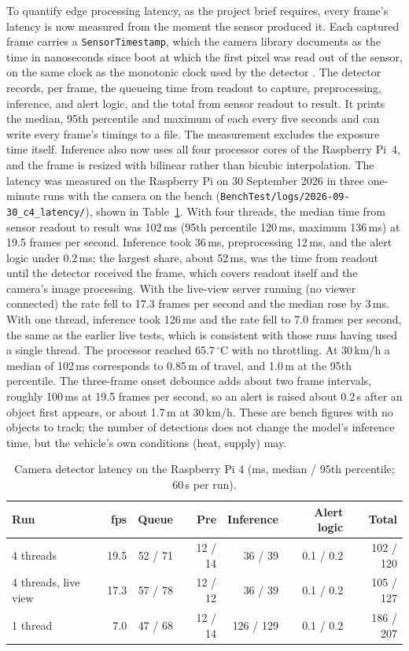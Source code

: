 To quantify edge processing latency, as the project brief requires, every frame's latency is now measured from the moment the sensor produced it. Each captured frame carries a \texttt{SensorTimestamp}, which the camera library documents as the time in nanoseconds since boot at which the first pixel was read out of the sensor, on the same clock as the monotonic clock used by the detector \cite{picamera2manual}. The detector records, per frame, the queueing time from readout to capture, preprocessing, inference, and alert logic, and the total from sensor readout to result. It prints the median, 95th percentile and maximum of each every five seconds and can write every frame's timings to a file. The measurement excludes the exposure time itself. Inference also now uses all four processor cores of the Raspberry Pi~4, and the frame is resized with bilinear rather than bicubic interpolation. The latency was measured on the Raspberry Pi on 30 September 2026 in three one-minute runs with the camera on the bench (\texttt{BenchTest/logs/2026-09-30\_c4\_latency/}), shown in Table~\ref{tab:camera-latency}. With four threads, the median time from sensor readout to result was 102\,ms (95th percentile 120\,ms, maximum 136\,ms) at 19.5 frames per second. Inference took 36\,ms, preprocessing 12\,ms, and the alert logic under 0.2\,ms; the largest share, about 52\,ms, was the time from readout until the detector received the frame, which covers readout itself and the camera's image processing. With the live-view server running (no viewer connected) the rate fell to 17.3 frames per second and the median rose by 3\,ms. With one thread, inference took 126\,ms and the rate fell to 7.0 frames per second, the same as the earlier live tests, which is consistent with those runs having used a single thread. The processor reached 65.7\,$^\circ$C with no throttling. At 30\,km/h a median of 102\,ms corresponds to 0.85\,m of travel, and 1.0\,m at the 95th percentile. The three-frame onset debounce adds about two frame intervals, roughly 100\,ms at 19.5 frames per second, so an alert is raised about 0.2\,s after an object first appears, or about 1.7\,m at 30\,km/h. These are bench figures with no objects to track; the number of detections does not change the model's inference time, but the vehicle's own conditions (heat, supply) may.

\begin{table}[htbp]
\centering
\caption{Camera detector latency on the Raspberry Pi 4 (ms, median / 95th percentile; 60\,s per run).}
\label{tab:camera-latency}
\begin{tabular}{lrrrrrr}
\hline
Run & fps & Queue & Pre & Inference & Alert logic & Total \\
\hline
4 threads & 19.5 & 52 / 71 & 12 / 14 & 36 / 39 & 0.1 / 0.2 & 102 / 120 \\
4 threads, live view & 17.3 & 57 / 78 & 12 / 12 & 36 / 39 & 0.1 / 0.2 & 105 / 127 \\
1 thread & 7.0 & 47 / 68 & 12 / 14 & 126 / 129 & 0.1 / 0.2 & 186 / 207 \\
\hline
\end{tabular}
\end{table}

